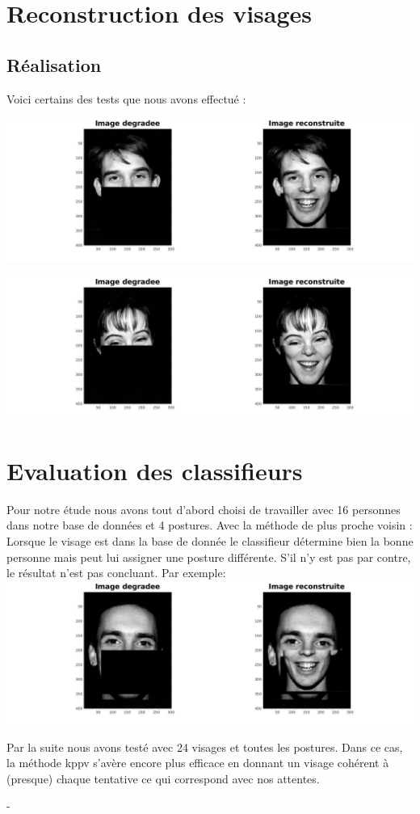 \documentclass[frenchb]{article}
\begin{document}
	
	
	
	\section{Reconstruction des visages}
	\subsection{Réalisation}
	Voici certains des tests que nous avons effectué :
	
	\includegraphics[scale=.2]{5.jpg}
		
	\includegraphics[scale=.2]{6.jpg}
	\newpage
	\section{Evaluation des classifieurs}
	Pour notre étude nous avons tout d'abord choisi de travailler avec 16 personnes dans notre base de données et 4 postures.
	Avec la méthode de plus proche voisin :
	Lorsque le visage est dans la base de donnée le classifieur détermine bien la bonne personne mais peut lui assigner une posture différente. S'il n'y est pas par contre, le résultat n'est pas concluant. Par exemple:
	\includegraphics[scale=.2]{nul.jpg}
	
	
	Par la suite nous avons testé avec 24 visages et toutes les postures.
	Dans ce cas, la méthode kppv s'avère encore plus efficace en donnant un visage cohérent à (presque) chaque tentative ce qui correspond avec nos attentes.
	
	- 
	
	
\end{document}
